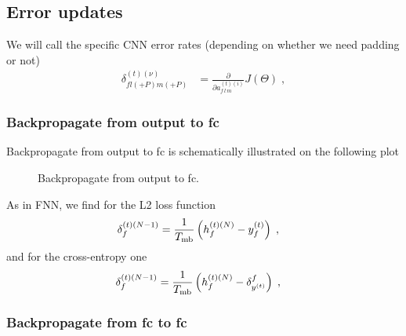 \subsection{Error updates}

We will call the specific CNN error rates (depending on whether we need padding or not)
\begin{align}
\delta^{(t)(\nu)}_{fl(+P)m(+P)}&=\frac{\partial }{\partial a_{f\,l\,m}^{(t)(i)}}J(\Theta)\;,
\end{align}


\subsubsection{Backpropagate from output to fc}

Backpropagate from output to fc is schematically illustrated on the following plot

\begin{figure}[H]
\begin{center}
\caption{Backpropagate from output to fc.}
\end{center}
\end{figure}
As in FNN, we find for the L2 loss function
\begin{align}
\delta^{(t)(N-1)}_f&= \frac{1}{T_{{\rm mb}}}\left(h_{f}^{(t)(N)}-y_f^{(t)}\right)\;,
\end{align}
and for the cross-entropy one
\begin{align}
\delta^{(t)(N-1)}_f&= \frac{1}{T_{{\rm mb}}}\left(h_{f}^{(t)(N)}-\delta_{y^{(t)}}^f\right)\;,
\end{align}

\subsubsection{Backpropagate from fc to fc}

